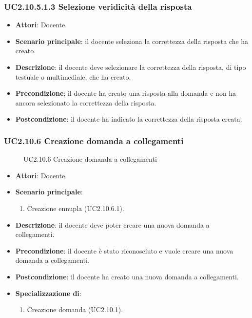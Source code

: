 \subsubsection{UC2.10.5.1.3 Selezione veridicità della risposta}
\begin{itemize}
\item \textbf{Attori}: Docente.
\item \textbf{Scenario principale}: il docente seleziona la correttezza della risposta che ha creato.
\item \textbf{Descrizione}: il docente deve selezionare la correttezza della risposta, di tipo testuale o multimediale, che ha creato.
\item \textbf{Precondizione}: il docente ha creato una risposta alla domanda e non ha ancora selezionato la correttezza della risposta.
\item \textbf{Postcondizione}: il docente ha indicato la correttezza della risposta creata.
\end{itemize}
\subsubsection{UC2.10.6 Creazione domanda a collegamenti}
\begin{figure}[H]
\centering
\noindent{}
\caption{UC2.10.6 Creazione domanda a collegamenti}
\end{figure}
\begin{itemize}
\item \textbf{Attori}: Docente.
\item \textbf{Scenario principale}:
\begin{enumerate}
\item Creazione ennupla (UC2.10.6.1).
\end{enumerate}
\item \textbf{Descrizione}: il docente deve poter creare una nuova domanda a collegamenti.
\item \textbf{Precondizione}: il docente è stato riconosciuto e vuole creare una nuova domanda a collegamenti.
\item \textbf{Postcondizione}: il docente ha creato una nuova domanda a collegamenti.
\item \textbf{Specializzazione di}:
\begin{enumerate}
\item Creazione domanda (UC2.10.1).
\end{enumerate}
\end{itemize}
